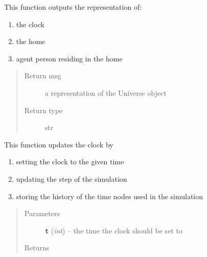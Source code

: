 \documentclass[letterpaper,10pt,english]{sphinxmanual}
\begin{document}
\begin{fulllineitems}
\begin{fulllineitems}
This function outputs the representation of:
\begin{enumerate}
\item {} 
the clock

\item {} 
the home

\item {} 
agent person residing in the home

\end{enumerate}
\begin{quote}\begin{description}
\item[{Return msg}] \leavevmode
a representation of the Universe object

\item[{Return type}] \leavevmode
str

\end{description}\end{quote}

\end{fulllineitems}


\begin{fulllineitems}
\label{universe:universe.Universe.update_clock}
This function updates the clock by
\begin{enumerate}
\item {} 
setting the clock to the given time

\item {} 
updating the step of the simulation

\item {} 
storing the history of the time nodes used in the simulation

\end{enumerate}
\begin{quote}\begin{description}
\item[{Parameters}] \leavevmode
\textbf{\texttt{t}} (\emph{int}) -- the time the clock should be set to

\item[{Returns}] \leavevmode


\end{description}\end{quote}

\end{fulllineitems}


\end{fulllineitems}
\end{document}

